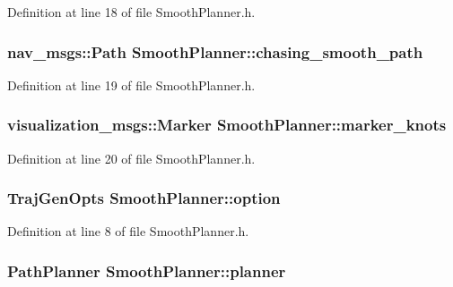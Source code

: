 Definition at line 18 of file Smooth\+Planner.\+h.

\subsubsection[{\texorpdfstring{chasing\+\_\+smooth\+\_\+path}{chasing_smooth_path}}]{\setlength{\rightskip}{0pt plus 5cm}nav\+\_\+msgs\+::\+Path Smooth\+Planner\+::chasing\+\_\+smooth\+\_\+path}\hypertarget{class_smooth_planner_a6a33038c6041ff972bea7765780b56d0}{}\label{class_smooth_planner_a6a33038c6041ff972bea7765780b56d0}


Definition at line 19 of file Smooth\+Planner.\+h.

\subsubsection[{\texorpdfstring{marker\+\_\+knots}{marker_knots}}]{\setlength{\rightskip}{0pt plus 5cm}visualization\+\_\+msgs\+::\+Marker Smooth\+Planner\+::marker\+\_\+knots}\hypertarget{class_smooth_planner_afeeab9ce830d4960babdc84c82da94ea}{}\label{class_smooth_planner_afeeab9ce830d4960babdc84c82da94ea}


Definition at line 20 of file Smooth\+Planner.\+h.

\subsubsection[{\texorpdfstring{option}{option}}]{\setlength{\rightskip}{0pt plus 5cm}Traj\+Gen\+Opts Smooth\+Planner\+::option}\hypertarget{class_smooth_planner_af0c954aea3c6b5b82a160ed4be93fb17}{}\label{class_smooth_planner_af0c954aea3c6b5b82a160ed4be93fb17}


Definition at line 8 of file Smooth\+Planner.\+h.

\subsubsection[{\texorpdfstring{planner}{planner}}]{\setlength{\rightskip}{0pt plus 5cm}Path\+Planner Smooth\+Planner\+::planner}\hypertarget{class_smooth_planner_aa9df69d4f514c7338ab2d066d38dd1a2}{}\label{class_smooth_planner_aa9df69d4f514c7338ab2d066d38dd1a2}


